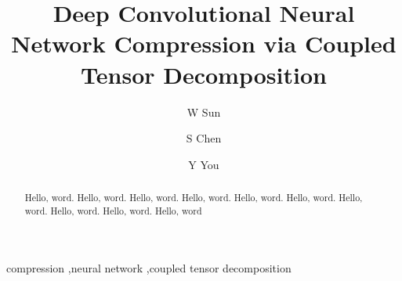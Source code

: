 \documentclass[5p]{elsarticle} %
\begin{document}

\begin{frontmatter}



\title{Deep Convolutional Neural Network Compression via Coupled Tensor Decomposition}


\author[address1]{W Sun }

\author[address2]{S Chen}

\author[address1]{Y You}

\address[address1]{Shenzhen, Guangdong, China}
\address[address2]{Guangzhou, Guangdong, China}



\begin{abstract}
Hello, word. Hello, word. Hello, word. Hello, word. Hello, word. Hello, word. Hello, word. Hello, word. Hello, word. Hello, word
\end{abstract}


\begin{keyword}
compression \sep neural network \sep coupled tensor decomposition
\end{keyword}


\end{frontmatter}
\end{document}
